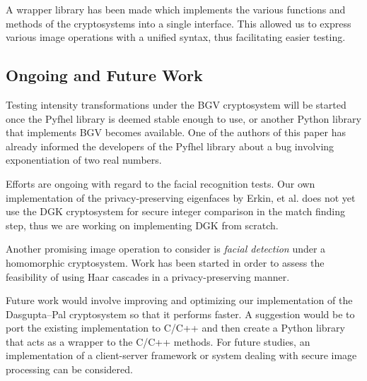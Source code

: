 A wrapper library has been made which implements the various functions and methods of the cryptosystems into a single interface. This allowed us to express various image operations with a unified syntax, thus facilitating easier testing.

\subsection{Ongoing and Future Work}
Testing intensity transformations under the BGV cryptosystem will be started once the Pyfhel library is deemed stable enough to use, or another Python library that implements BGV becomes available. 
One of the authors of this paper has already informed the developers of the Pyfhel library about a bug involving exponentiation of two real numbers. 

Efforts are ongoing with regard to the facial recognition tests. Our own implementation of the privacy-preserving  eigenfaces by Erkin, et al. does not yet use the DGK cryptosystem for secure integer comparison in the match finding step, thus we are working on implementing DGK from scratch. 

Another promising image operation to consider is \textit{facial detection} under a homomorphic cryptosystem. Work has been started in order to assess the feasibility of using Haar cascades in a privacy-preserving manner.

Future work would involve improving and optimizing our implementation of the Dasgupta--Pal cryptosystem so that it performs faster. A suggestion would be to port the existing implementation to C/C++ and then create a Python library that acts as a wrapper to the C/C++ methods. For future studies, an implementation of a client-server framework or system dealing with secure image processing can be considered.



